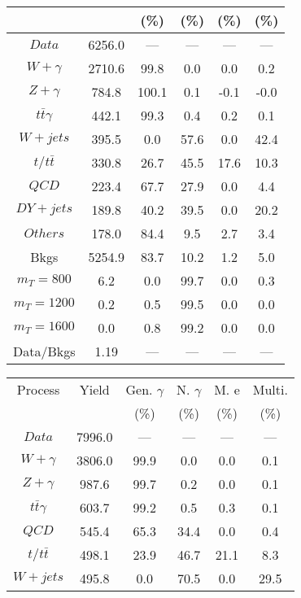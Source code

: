 \begin{figure}
\begin{minipage}[c]{0.32\textwidth}
{\begin{tabular}{cccccc}
 &  & (\%) & (\%) & (\%) & (\%)  \\
\hline
                                                                      $ Data $ &  6256.0 &  --- &  --- &  --- &  ---\\
$ W+\gamma $ &  2710.6 &  99.8 &  0.0 &  0.0 &  0.2\\
$ Z+\gamma $ &  784.8 &  100.1 &  0.1 &  -0.1 &  -0.0\\
$ t\bar{t}\gamma $ &  442.1 &  99.3 &  0.4 &  0.2 &  0.1\\
$ W+jets $ &  395.5 &  0.0 &  57.6 &  0.0 &  42.4\\
$ t/t\bar{t} $ &  330.8 &  26.7 &  45.5 &  17.6 &  10.3\\
$ QCD $ &  223.4 &  67.7 &  27.9 &  0.0 &  4.4\\
$ DY+jets $ &  189.8 &  40.2 &  39.5 &  0.0 &  20.2\\
$ Others $ &  178.0 &  84.4 &  9.5 &  2.7 &  3.4\\
Bkgs &  5254.9 &  83.7 &  10.2 &  1.2 &  5.0\\
$ m_{T} = 800 $ &  6.2 &  0.0 &  99.7 &  0.0 &  0.3\\
$ m_{T} = 1200 $ &  0.2 &  0.5 &  99.5 &  0.0 &  0.0\\
$ m_{T} = 1600 $ &  0.0 &  0.8 &  99.2 &  0.0 &  0.0\\
Data/Bkgs &  1.19 &  --- &  --- &  --- &  ---\\
\hline
\end{tabular}
}
\end{minipage}
\begin{minipage}[c]{0.32\textwidth}
\centering
\tiny{
\begin{tabular}{cccccc}
\hline
Process & Yield & Gen. $\gamma$ & N. $\gamma$ & M. e & Multi. \\
 &  & (\%) & (\%) & (\%) & (\%)  \\
\hline
                                                                      $ Data $ &  7996.0 &  --- &  --- &  --- &  ---\\
$ W+\gamma $ &  3806.0 &  99.9 &  0.0 &  0.0 &  0.1\\
$ Z+\gamma $ &  987.6 &  99.7 &  0.2 &  0.0 &  0.1\\
$ t\bar{t}\gamma $ &  603.7 &  99.2 &  0.5 &  0.3 &  0.1\\
$ QCD $ &  545.4 &  65.3 &  34.4 &  0.0 &  0.4\\
$ t/t\bar{t} $ &  498.1 &  23.9 &  46.7 &  21.1 &  8.3\\
$ W+jets $ &  495.8 &  0.0 &  70.5 &  0.0 &  29.5\\

\end{tabular}}
\end{minipage}
\end{figure}

